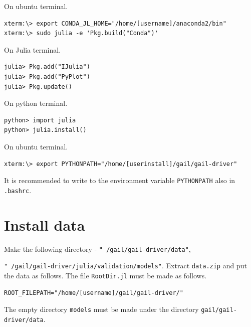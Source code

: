 \documentclass[openany,11pt]{report}%
\begin{document}
On ubuntu terminal.
\begin{lstlisting}[style=DOS]
xterm:\> export CONDA_JL_HOME="/home/[username]/anaconda2/bin"
xterm:\> sudo julia -e 'Pkg.build("Conda")'
\end{lstlisting}

On Julia terminal.
\begin{lstlisting}[style=DOS]
julia> Pkg.add("IJulia")
julia> Pkg.add("PyPlot")
julia> Pkg.update()
\end{lstlisting}

On python terminal.
\begin{lstlisting}[style=DOS]
python> import julia
python> julia.install()
\end{lstlisting}

On ubuntu terminal.

\begin{lstlisting}[style=DOS]
xterm:\> export PYTHONPATH="/home/[userinstall]/gail/gail-driver"
\end{lstlisting}

It is recommended to write to the environment variable {\tt PYTHONPATH} also in {\tt .bashrc}.


\section{Install data}

Make the following directory - {\tt "~/gail/gail-driver/data"}, 

{\tt "~/gail/gail-driver/julia/validation/models"}. Extract {\tt data.zip} and put the data as follows. The file {\tt RootDir.jl} must be made as follows.

\begin{lstlisting}[style=DOS]
ROOT_FILEPATH="/home/[username]/gail/gail-driver/"
\end{lstlisting}

The empty directory {\tt models} must be made under the directory {\tt gail/gail-driver/data}.
\end{document}
